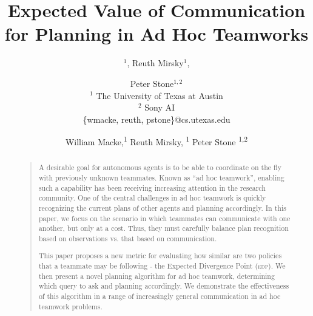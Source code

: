 \documentclass[letterpaper]{article}
\title{}
\author{$^1$, Reuth Mirsky$^1$, \and Peter Stone$^{1,2}$
\\ $^1$ The University of Texas at Austin
\\ $^2$ Sony AI
\\ \{wmacke, reuth, pstone\}@cs.utexas.edu}
\title{Expected Value of Communication \\ for Planning in Ad Hoc Teamworks}
\author {
    William Macke,\textsuperscript{\rm 1}
    Reuth Mirsky, \textsuperscript{\rm 1}
    Peter Stone \textsuperscript{\rm 1,2} \\
}
\begin{document}
 
\maketitle

\begin{abstract}
\begin{quote}
    A desirable goal for autonomous agents is to be able to coordinate on the fly with previously unknown teammates.  Known as “ad hoc teamwork”, enabling such a capability has been receiving increasing attention in the research community. One of the central challenges in ad hoc teamwork is quickly recognizing the current plans of other agents and planning accordingly.  In this paper, we focus on the scenario in which teammates can communicate with one another, but only at a cost.  Thus, they must carefully balance plan recognition based on observations vs. that based on communication.
    
    This paper proposes a new metric for evaluating how similar are two policies that a teammate may be following - the Expected Divergence Point (\textsc{edp}).
    We then present a novel planning algorithm for ad hoc teamwork, determining which query to ask and planning accordingly. We demonstrate the effectiveness of this algorithm in a range of increasingly general communication in ad hoc teamwork problems.
    
        
\end{quote}
\end{abstract}
\end{document}

